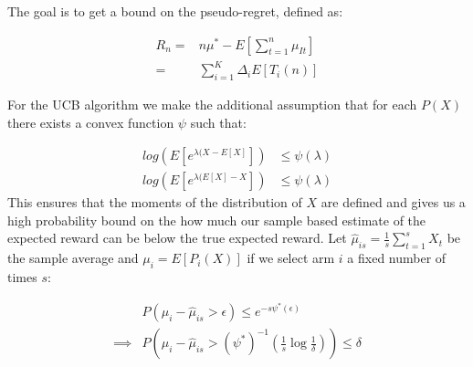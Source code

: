\documentclass{article}
\newcommand{\eqn}[1]{\begin{align}#1\end{align}}
\theoremstyle{plain}
\theoremstyle{definition}
\begin{document}
The goal is to get a bound on the pseudo-regret, defined as:

\eqn{
R_n  = & n\mu^* - E\left[\sum_{t = 1}^n \mu_{It}\right] \\
\label{eq:regretK}
= & \sum_{i=1}^K \Delta_i E[T_i(n)] 
}


For the UCB algorithm we make the additional assumption that for each $P(X)$ there exists a convex function $\psi$ such that:

\begin{equation}
\begin{aligned}
log(E[e^{\lambda(X-E[X]}]) & \leq \psi(\lambda)\\
log(E[e^{\lambda(E[X]-X}]) & \leq \psi(\lambda)
\end{aligned}
\end{equation}
This ensures that the moments of the distribution of $X$ are defined and gives us a high probability bound on the how much our sample based estimate of the expected reward can be below the true expected reward. Let  $\hat \mu_{is} = \frac{1}{s}\sum_{t=1}^s X_t$ be the sample average and $\mu_{i} = E[P_i(X)]$ if we select arm $i$ a fixed number of times $s$:

\eqn {
\label{eq:hoeff1}
& P( \mu_{i} - \hat \mu_{is}  > \epsilon) \leq e^{-s\psi^*(\epsilon)} \\
\label{eq:hoeff2}
 \implies & P\left(\mu_{i} - \hat \mu_{is} > (\psi^{*})^{-1}\left( \frac{1}{s}\log\frac{1}{\delta}\right)\right) \leq \delta
}
\end{document}
